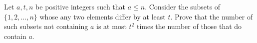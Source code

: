 Let $a,t,n$ be positive integers such that $a\le n$. Consider the subsets of $\{1,2,\dots,n\}$ whose any two elements differ by at least $t$. Prove that the number of such subsets not containing $a$ is at most $t^2$ times the number of those that do contain $a$.